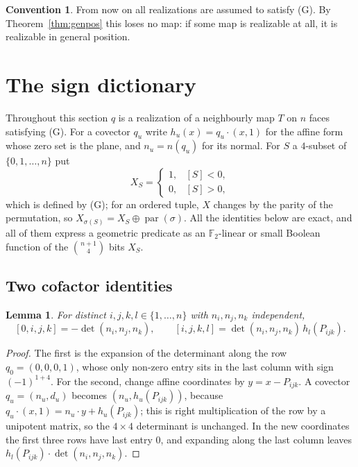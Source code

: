 \documentclass[11pt,reqno]{amsart}
\theoremstyle{plain}
\newtheorem{lemma}[theorem]{Lemma}
\theoremstyle{definition}
\newtheorem{convention}[theorem]{Convention}
\newcommand{\FF}{\mathbb{F}_2}
\newcommand{\bra}[1]{[#1]}
\newcommand{\xor}{\oplus}
\DeclareMathOperator{\dett}{det}
\begin{document}
\begin{convention}\label{conv:genpos}
From now on all realizations are assumed to satisfy \textup{(G)}. By Theorem~\ref{thm:genpos} this
loses no map: if some map is realizable at all, it is realizable in general position.
\end{convention}

\section{The sign dictionary}\label{sec:dictionary}

Throughout this section $q$ is a realization of a neighbourly map $T$ on $n$ faces satisfying (G). For
a covector $q_u$ write $h_u(x)=q_u\cdot(x,1)$ for the affine form whose zero set is the plane, and
$n_u=n(q_u)$ for its normal. For $S$ a $4$-subset of $\{0,1,\dots,n\}$ put
\[
  X_S=\begin{cases}1,&\bra{S}<0,\\ 0,&\bra{S}>0,\end{cases}
\]
which is defined by (G); for an ordered tuple, $X$ changes by the parity of the permutation, so
$X_{\sigma(S)}=X_S\xor\operatorname{par}(\sigma)$. All the identities below are exact, and all of them
express a geometric predicate as an $\FF$-linear or small Boolean function of the $\binom{n+1}{4}$
bits $X_S$.

\subsection{Two cofactor identities}

\begin{lemma}\label{lem:cofactor}
For distinct $i,j,k,l\in\{1,\dots,n\}$ with $n_i,n_j,n_k$ independent,
\[
  \bra{0,i,j,k}=-\dett(n_i,n_j,n_k),
  \qquad
  \bra{i,j,k,l}=\dett(n_i,n_j,n_k)\,h_l(P_{ijk}).
\]
\end{lemma}

\begin{proof}
The first is the expansion of the determinant along the row $q_0=(0,0,0,1)$, whose only non-zero entry
sits in the last column with sign $(-1)^{1+4}$. For the second, change affine coordinates by
$y=x-P_{ijk}$. A covector $q_u=(n_u,d_u)$ becomes $(n_u,h_u(P_{ijk}))$, because
$q_u\cdot(x,1)=n_u\cdot y+h_u(P_{ijk})$; this is right multiplication of the row by a unipotent matrix,
so the $4\times4$ determinant is unchanged. In the new coordinates the first three rows have last
entry $0$, and expanding along the last column leaves
$h_l(P_{ijk})\cdot\dett(n_i,n_j,n_k)$.
\end{proof}
\end{document}
